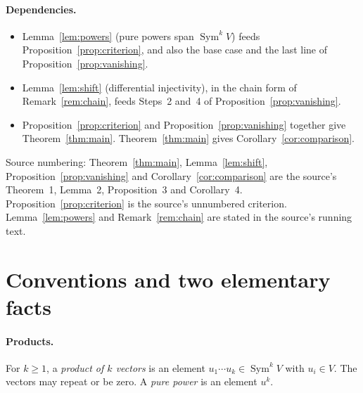 \documentclass[11pt]{article}
\theoremstyle{remark}
\DeclareMathOperator{\Sym}{Sym}
\begin{document}
\paragraph{Dependencies.}
\begin{itemize}[leftmargin=2em]
\item Lemma~\ref{lem:powers} (pure powers span $\Sym^kV$) feeds
 Proposition~\ref{prop:criterion}, and also the base case and the last
 line of Proposition~\ref{prop:vanishing}.
\item Lemma~\ref{lem:shift} (differential injectivity), in the chain form
 of Remark~\ref{rem:chain}, feeds Steps~2 and~4 of
 Proposition~\ref{prop:vanishing}.
\item Proposition~\ref{prop:criterion} and Proposition~\ref{prop:vanishing}
 together give Theorem~\ref{thm:main}. Theorem~\ref{thm:main} gives
 Corollary~\ref{cor:comparison}.
\end{itemize}
Source numbering: Theorem~\ref{thm:main}, Lemma~\ref{lem:shift},
Proposition~\ref{prop:vanishing} and Corollary~\ref{cor:comparison} are the
source's Theorem~1, Lemma~2, Proposition~3 and Corollary~4.
Proposition~\ref{prop:criterion} is the source's unnumbered criterion.
Lemma~\ref{lem:powers} and Remark~\ref{rem:chain} are stated in the
source's running text.

\section{Conventions and two elementary facts}\label{sec:conventions}

\paragraph{Products.}
For $k\ge1$, a \emph{product of $k$ vectors} is an element
$u_1\cdots u_k\in\Sym^kV$ with $u_i\in V$. The vectors may repeat or be
zero. A \emph{pure power} is an element $u^k$.
\end{document}
